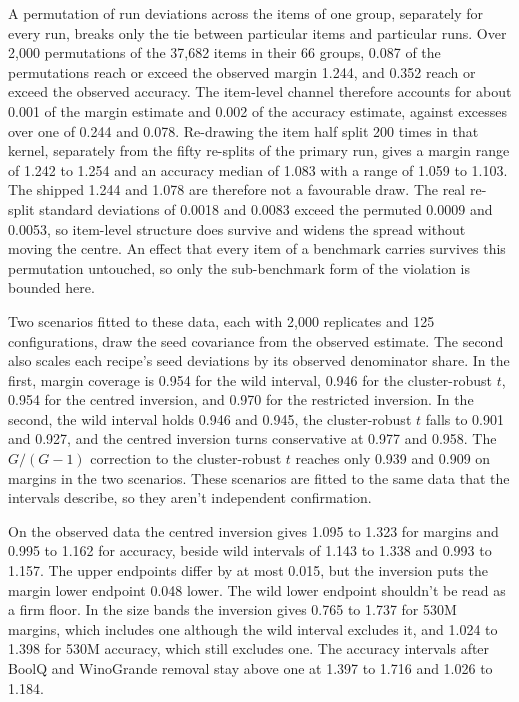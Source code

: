 A permutation of run deviations across the items of one group, separately for every run, breaks only the tie between particular items and particular runs. Over 2,000 permutations of the 37,682 items in their 66 groups, 0.087 of the permutations reach or exceed the observed margin 1.244, and 0.352 reach or exceed the observed accuracy. The item-level channel therefore accounts for about 0.001 of the margin estimate and 0.002 of the accuracy estimate, against excesses over one of 0.244 and 0.078. Re-drawing the item half split 200 times in that kernel, separately from the fifty re-splits of the primary run, gives a margin range of 1.242 to 1.254 and an accuracy median of 1.083 with a range of 1.059 to 1.103. The shipped 1.244 and 1.078 are therefore not a favourable draw. The real re-split standard deviations of 0.0018 and 0.0083 exceed the permuted 0.0009 and 0.0053, so item-level structure does survive and widens the spread without moving the centre. An effect that every item of a benchmark carries survives this permutation untouched, so only the sub-benchmark form of the violation is bounded here.

Two scenarios fitted to these data, each with 2,000 replicates and 125 configurations, draw the seed covariance from the observed estimate. The second also scales each recipe's seed deviations by its observed denominator share. In the first, margin coverage is 0.954 for the wild interval, 0.946 for the cluster-robust $t$, 0.954 for the centred inversion, and 0.970 for the restricted inversion. In the second, the wild interval holds 0.946 and 0.945, the cluster-robust $t$ falls to 0.901 and 0.927, and the centred inversion turns conservative at 0.977 and 0.958. The $G/(G-1)$ correction to the cluster-robust $t$ reaches only 0.939 and 0.909 on margins in the two scenarios. These scenarios are fitted to the same data that the intervals describe, so they aren't independent confirmation.

On the observed data the centred inversion gives 1.095 to 1.323 for margins and 0.995 to 1.162 for accuracy, beside wild intervals of 1.143 to 1.338 and 0.993 to 1.157. The upper endpoints differ by at most 0.015, but the inversion puts the margin lower endpoint 0.048 lower. The wild lower endpoint shouldn't be read as a firm floor. In the size bands the inversion gives 0.765 to 1.737 for 530M margins, which includes one although the wild interval excludes it, and 1.024 to 1.398 for 530M accuracy, which still excludes one. The accuracy intervals after BoolQ and WinoGrande removal stay above one at 1.397 to 1.716 and 1.026 to 1.184.

